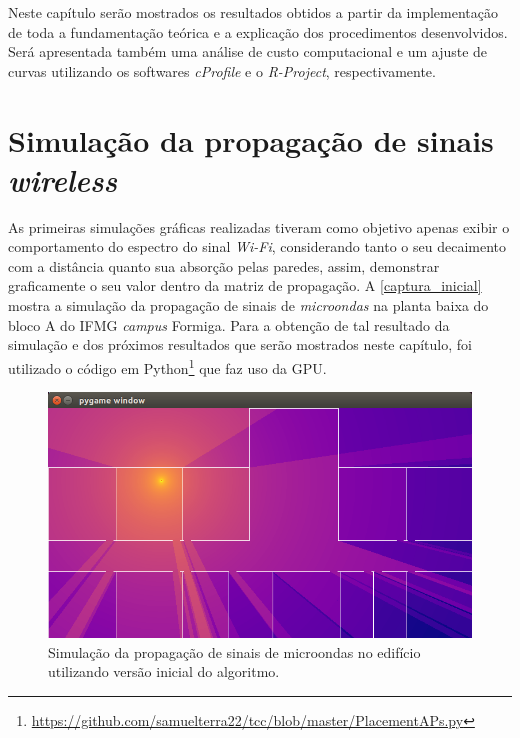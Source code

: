 \documentclass[
	12pt,				%
	twoside,			%
	a4paper,			%
	english,			%
	french,				%
	spanish,			%
	brazil				%
	]{abntex2}
\begin{document}
Neste capítulo serão mostrados os resultados obtidos a partir da
implementação de toda a fundamentação teórica e a explicação dos
procedimentos desenvolvidos. Será apresentada também uma análise de
custo computacional e um ajuste de curvas utilizando os softwares
\emph{cProfile} e o \emph{R-Project}, respectivamente.

\section{\texorpdfstring{Simulação da propagação de sinais
\emph{wireless}}{Simulação da propagação de sinais wireless}}\label{simulauxe7uxe3o-da-propagauxe7uxe3o-de-sinais-wireless}

As primeiras simulações gráficas realizadas tiveram como objetivo apenas
exibir o comportamento do espectro do sinal \emph{Wi-Fi}, considerando
tanto o seu decaimento com a distância quanto sua absorção pelas
paredes, assim, demonstrar graficamente o seu valor dentro da matriz de
propagação. A \autoref{captura_inicial} mostra a simulação da propagação
de sinais de \emph{microondas} na planta baixa do bloco A do IFMG
\emph{campus} Formiga. Para a obtenção de tal resultado da simulação e
dos próximos resultados que serão mostrados neste capítulo, foi
utilizado o código em Python\footnote{\url{https://github.com/samuelterra22/tcc/blob/master/PlacementAPs.py}}
que faz uso da GPU.

\begin{figure}[ht]
    \caption{\label{captura_inicial} Simulação da propagação de sinais de microondas no edifício utilizando versão inicial do algoritmo. }
    \begin{center}
        \includegraphics[scale=0.6]{imagens/captura-inicial.jpg}
    \end{center}
\end{figure}
\end{document}
